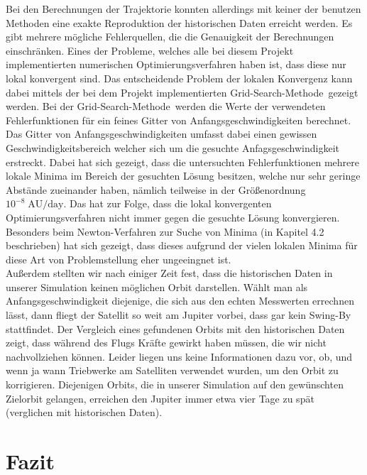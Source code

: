Bei den Berechnungen der Trajektorie konnten allerdings mit keiner der benutzen Methoden eine exakte Reproduktion der historischen Daten erreicht werden. Es gibt mehrere mögliche Fehlerquellen, die die Genauigkeit der Berechnungen einschränken. Eines der Probleme, welches alle bei diesem Projekt implementierten numerischen Optimierungsverfahren haben ist, dass diese nur lokal konvergent sind. Das entscheidende  Problem der lokalen Konvergenz kann dabei mittels der bei dem Projekt implementierten \glqq Grid-Search-Methode\grqq\, gezeigt werden. Bei der \glqq Grid-Search-Methode\grqq\, werden die Werte der verwendeten Fehlerfunktionen für ein feines Gitter von Anfangsgeschwindigkeiten berechnet. Das Gitter von Anfangsgeschwindigkeiten umfasst dabei einen gewissen Geschwindigkeitsbereich welcher sich um die gesuchte Anfagsgeschwindigkeit erstreckt. Dabei hat sich gezeigt, dass die untersuchten Fehlerfunktionen mehrere lokale Minima im Bereich der gesuchten Lösung besitzen, welche nur sehr geringe Abstände zueinander haben, nämlich teilweise in der Größenordnung $10^{-8}\;\text{AU/day}$. Das hat zur Folge, dass die lokal konvergenten Optimierungsverfahren nicht immer gegen die gesuchte Lösung konvergieren. Besonders beim Newton-Verfahren zur Suche von Minima (in Kapitel 4.2 beschrieben) hat sich gezeigt, dass dieses aufgrund der vielen lokalen Minima für diese Art von Problemstellung eher ungeeingnet ist.\\
Außerdem stellten wir nach einiger Zeit fest, dass die historischen Daten in unserer Simulation keinen möglichen Orbit darstellen. Wählt man als Anfangsgeschwindigkeit diejenige, die sich aus den echten Messwerten errechnen lässt, dann fliegt der Satellit so weit am Jupiter vorbei, dass gar kein Swing-By stattfindet. Der Vergleich eines gefundenen Orbits mit den historischen Daten zeigt, dass während des Flugs Kräfte gewirkt haben müssen, die wir nicht nachvollziehen können. Leider liegen uns keine Informationen dazu vor, ob, und wenn ja wann Triebwerke am Satelliten verwendet wurden, um den Orbit zu korrigieren. Diejenigen Orbits, die in unserer Simulation auf den gewünschten Zielorbit gelangen, erreichen den Jupiter immer etwa vier Tage zu spät (verglichen mit historischen Daten).



\section{Fazit}




